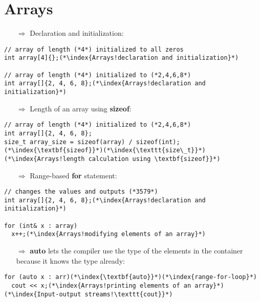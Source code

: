 \documentclass[10pt]{article}
\begin{document}
\section{Arrays}
\small
\begin{enumerate}
\item[$\Rightarrow$] Declaration and initialization:
\end{enumerate}
\begin{lstlisting}
// array of length (*4*) initialized to all zeros
int array[4]{};(*\index{Arrays!declaration and initialization}*)

// array of length (*4*) initialized to (*2,4,6,8*)
int array[]{2, 4, 6, 8};(*\index{Arrays!declaration and initialization}*)
\end{lstlisting}
\begin{enumerate}
\item[$\Rightarrow$] Length of an array using \textbf{sizeof}:
\end{enumerate}
\begin{lstlisting}
// array of length (*4*) initialized to (*2,4,6,8*)
int array[]{2, 4, 6, 8};
size_t array_size = sizeof(array) / sizeof(int);(*\index{\textbf{sizeof}}*)(*\index{\texttt{size\_t}}*)(*\index{Arrays!length calculation using \textbf{sizeof}}*)
\end{lstlisting}
\begin{enumerate}
\item[$\Rightarrow$] Range-based \textbf{for} statement:
\end{enumerate}
\begin{lstlisting}
// changes the values and outputs (*3579*)
int array[]{2, 4, 6, 8};(*\index{Arrays!declaration and initialization}*)

for (int& x : array)
  x++;(*\index{Arrays!modifying elements of an array}*)
\end{lstlisting}
\begin{enumerate}
\item[$\Rightarrow$] \textbf{auto} lets the compiler use the type of the elements in the container because it knows the type already:
\end{enumerate}
\begin{lstlisting}
for (auto x : arr)(*\index{\textbf{auto}}*)(*\index{range-for-loop}*)
  cout << x;(*\index{Arrays!printing elements of an array}*)(*\index{Input-output streams!\texttt{cout}}*)
\end{lstlisting}
%
%
\end{document}
